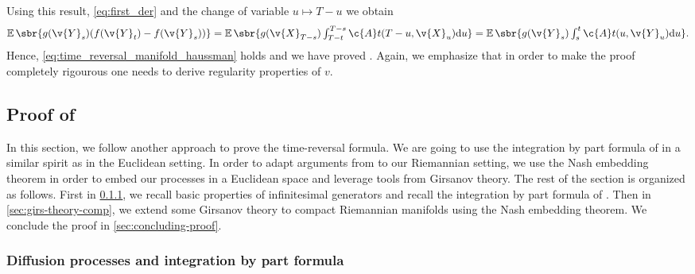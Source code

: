 Using this result, \eqref{eq:first_der} and the change of variable $u \mapsto T-u$ we obtain \begin{equation} \E\sbr{g(\v{Y}_s)(f(\v{Y}_t) - f(\v{Y}_s))} = \textstyle{\E\sbr{g(\v{X}_{T-s})\int_{T-t}^{T-s} \c{A}t(T-u, \v{X}_u) \mathrm{d} u } } = \textstyle{\E\sbr{g(\v{Y}_{s})\int_{s}^{t} \c{A}t(u, \v{Y}_u) \mathrm{d} u } } .
\end{equation}
Hence, \eqref{eq:time_reversal_manifold_haussman} holds and we have proved .
Again, we emphasize that in order to make the proof completely rigourous one needs to derive regularity properties of $v$.

\subsection{Proof of }
\label{sec:proof-crefthm:t}

In this section, we follow another approach to prove the time-reversal formula.
We are going to use the integration by part formula of \textcite[Theorem 3.17]{cattiaux2021time} in a similar spirit as \textcite[Theorem 4.9]{cattiaux2021time} in the Euclidean setting.
In order to adapt arguments from \textcite{cattiaux2021time} to our Riemannian setting, we use the Nash embedding theorem in order to embed our processes in a Euclidean space and leverage tools from Girsanov theory.
The rest of the section is organized as follows.
First in \cref{sec:diff-proc-stoch}, we recall basic properties of infinitesimal generators and recall the integration by part formula of \textcite[Theorem 3.17]{cattiaux2021time}.
Then in \cref{sec:girs-theory-comp}, we extend some Girsanov theory to compact Riemannian manifolds using the Nash embedding theorem.
We conclude the proof in \cref{sec:concluding-proof}.

\subsubsection{Diffusion processes and integration by part formula}
\label{sec:diff-proc-stoch}

